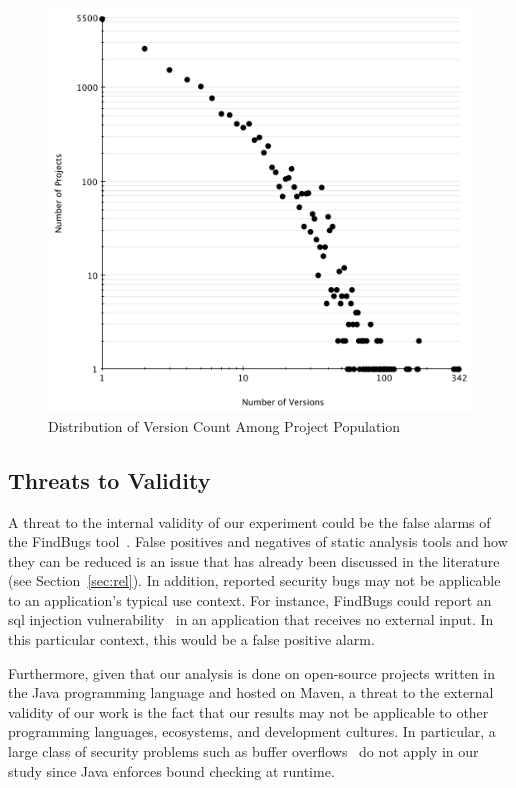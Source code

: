 \documentclass{sig-alternate}
\begin{document}
\begin{figure}[t]
	\centering
	\includegraphics[scale=0.42]{version_count.pdf}
	\caption{Distribution of Version Count Among Project Population}
	\label{fig:version-count}
\end{figure}

\subsection{Threats to Validity}
\label{sec:threats}

A threat to the internal validity of our experiment could be the false alarms of the
FindBugs tool~\cite{AP10, HP04}. False positives and negatives of static analysis tools and
how they can be reduced is an issue that has already been discussed in the literature
(see Section~\ref{sec:rel}).
In addition, reported security bugs may not be applicable to an
application's typical use context.
For instance, FindBugs could report an {\sc sql} injection vulnerability~\cite{RL12}
in an application that receives no external input.
In this particular context, this would be a false positive alarm.

Furthermore, given that our analysis is done on open-source projects
written in the Java programming language and hosted on Maven,
a threat to the external validity of our work
is the fact that our results may not be applicable to other
programming languages, ecosystems, and development cultures.
In particular, a large class of security problems such as
buffer overflows~\cite{K11} do not apply in our study since
Java enforces bound checking at runtime.
\end{document}
